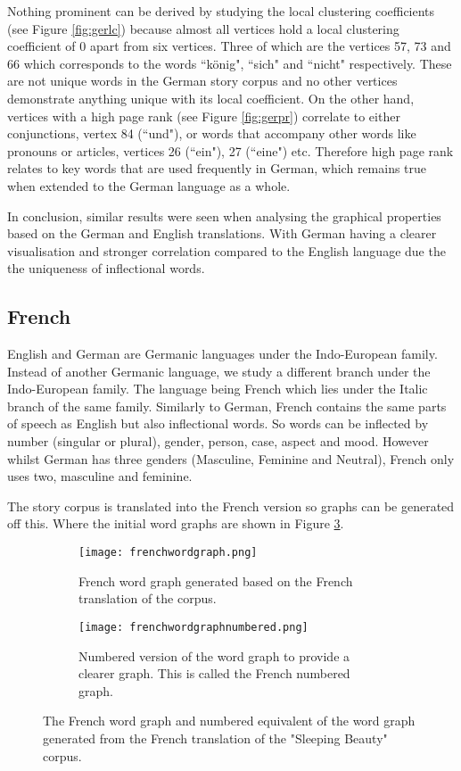 Nothing prominent can be derived by studying the local clustering coefficients (see Figure \ref{fig:gerlc}) because almost all vertices hold a local clustering coefficient of 0 apart from six vertices. Three of which are the vertices 57, 73 and 66 which corresponds to the words ``könig", ``sich" and ``nicht" respectively. These are not unique words in the German story corpus and no other vertices demonstrate anything unique with its local coefficient. 
On the other hand, vertices with a high page rank (see Figure \ref{fig:gerpr}) correlate to either conjunctions, vertex 84 (``und"), or words that accompany other words like pronouns or articles, vertices 26 (``ein"), 27 (``eine") etc. Therefore high page rank relates to key words that are used frequently in German, which remains true when extended to the German language as a whole.

In conclusion, similar results were seen when analysing the graphical properties based on the German and English translations. With German having a clearer visualisation and stronger correlation compared to the English language due the the uniqueness of inflectional words.

\subsection{French}
English and German are Germanic languages under the Indo-European family. Instead of another Germanic language, we study a different branch under the Indo-European family. The language being French which lies under the Italic branch of the same family. Similarly to German, French contains the same parts of speech as English but also inflectional words. So words can be inflected by number (singular or plural), gender, person, case, aspect and mood. However whilst German has three genders (Masculine, Feminine and Neutral), French \cite{hawkins2015french} only uses two, masculine and feminine. 

The story corpus is translated into the French version so graphs can be generated off this. Where the initial word graphs are shown in Figure \ref{fig:fregraph}. 

\begin{figure}[H]
\centering
\begin{subfigure}{.45\textwidth}
	\texttt{[image: frenchwordgraph.png]}
	\caption{French word graph generated based on the French translation of the corpus.}
	\label{fig:freword}
\end{subfigure}
\hfill
\begin{subfigure}{.45\textwidth}
	\texttt{[image: frenchwordgraphnumbered.png]}
	\caption{Numbered version of the word graph to provide a clearer graph. This is called the French numbered graph.}
	\label{fig:frenum}
\end{subfigure}
\caption{The French word graph and numbered equivalent of the word graph generated from the French translation of the "Sleeping Beauty" corpus.}
\label{fig:fregraph}
\end{figure}


